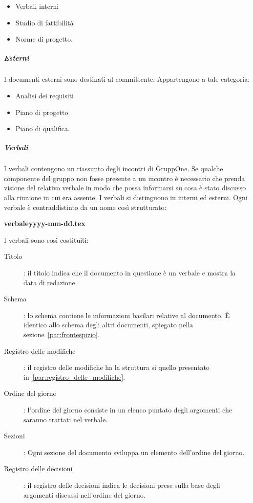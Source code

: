\documentclass[../norme-di-progetto.tex]{subfiles}
\begin{document}
\begin{itemize}
  \item Verbali interni
  \item Studio di fattibilità
  \item Norme di progetto.
\end{itemize}

\subparagraph{Esterni}%
\label{subp:suddivisione_dei_documenti/esterni}
I documenti esterni sono destinati al committente. Appartengono a tale categoria:

\begin{itemize}
  \item Analisi dei requisiti
  \item Piano di progetto
  \item Piano di qualifica.
\end{itemize}

\subparagraph{Verbali}%
\label{subp:verbali}
I verbali contengono un riassunto degli incontri di GruppOne.
Se qualche componente del gruppo non fosse presente a un incontro è necessario che prenda visione del relativo verbale in modo che possa informarsi su cosa è stato discusso alla riunione in cui era assente.
I verbali si distinguono in interni ed esterni. Ogni verbale è contraddistinto da un nome così strutturato:
\begin{center}
  \textbf{verbaleyyyy-mm-dd.tex}
\end{center}
I verbali sono così costituiti:

\begin{description}
  \item [Titolo]: il titolo indica che il documento in questione è un verbale e mostra la data di redazione.
  \item [Schema]: lo schema contiene le informazioni basilari relative al documento. È identico allo schema degli altri documenti, spiegato nella sezione~\ref{par:frontespizio}.
  \item [Registro delle modifiche]: il registro delle modifiche ha la struttura si quello presentato in~\ref{par:registro_delle_modifiche}.
  \item [Ordine del giorno]: l'ordine del giorno consiste in un elenco puntato degli argomenti che saranno trattati nel verbale.
  \item [Sezioni]: Ogni sezione del documento sviluppa un elemento dell'ordine del giorno.
  \item [Registro delle decisioni]: il registro delle decisioni indica le decisioni prese sulla base degli argomenti discussi nell'ordine del giorno.
\end{description}
\end{document}
